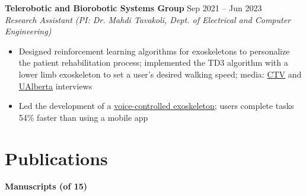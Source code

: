 \documentclass{article}
\begin{document}
\textbf{Telerobotic and Biorobotic Systems Group} \hfill Sep 2021 -- Jun 2023\\
\textit{Research Assistant (PI: Dr. Mahdi Tavakoli, Dept. of Electrical and Computer Engineering)}
\begin{itemize}
    \item Designed reinforcement learning algorithms for exoskeletons to personalize the patient rehabilitation process; implemented the TD3 algorithm with a lower limb exoskeleton to set a user's desired walking speed; media: \href{https://edmonton.ctvnews.ca/u-of-a-integrating-artificial-intelligence-into-exoskeleton-technology-1.6019787}{CTV} and \href{https://www.linkedin.com/posts/university-of-alberta_ai-voice-controlled-exoskeleton-activity-6954902847477997568-CTf4?utm_source=linkedin_share&utm_medium=member_desktop_web}{UAlberta} interviews
    \item Led the development of a \href{https://doi.org/10.1109/ICHMS59971.2024.10555587}{voice-controlled exoskeleton}; users complete tasks 54\% faster than using a mobile app
\end{itemize}


\section*{\textcolor{my_colour}{Publications}}
\vspace{-.25em} \hrulefill \vspace{.25em}

\textbf{Manuscripts \normalfont (of 15)} \vspace{.5em}
\end{document}
